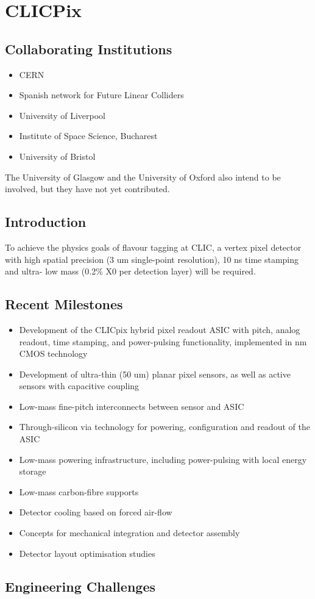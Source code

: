 \section{CLICPix}
\subsection{Collaborating Institutions}
\begin{itemize}
    \item CERN
    \item Spanish network for Future Linear Colliders
    \item University of Liverpool
    \item Institute of Space Science, Bucharest
    \item University of Bristol
\end{itemize}
The University of Glasgow and the University of Oxford also intend to be involved, but they have not yet contributed.

\subsection{Introduction}
To achieve the physics goals of flavour tagging at CLIC, a vertex pixel detector with high spatial precision (3 um single-point resolution), 10 ns time stamping and ultra- low mass (0.2\% X0 per detection layer) will be required.

\subsection{Recent Milestones}
\begin{itemize}
\item Development of the CLICpix hybrid pixel readout ASIC with \unit[25]{\micron} pitch, analog readout, time stamping, and power-pulsing functionality, implemented in \unit[65]{nm} CMOS technology
\item Development of ultra-thin (50 um) planar pixel sensors, as well as active sensors with capacitive coupling
\item Low-mass fine-pitch interconnects between sensor and ASIC
\item Through-silicon via technology for powering, configuration and readout of the ASIC
\item Low-mass powering infrastructure, including power-pulsing with local energy storage
\item Low-mass carbon-fibre supports
\item Detector cooling based on forced air-flow
\item Concepts for mechanical integration and detector assembly
\item Detector layout optimisation studies
\end{itemize}

\subsection{Engineering Challenges}
